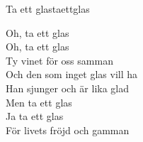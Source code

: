 \begin{song}{Ta ett glas}{taettglas}
\begin{vers}
Oh, ta ett glas\\
Oh, ta ett glas\\
Ty vinet för oss samman\\
Och den som inget glas vill ha\\
Han sjunger och är lika glad\\
Men ta ett glas\\
Ja ta ett glas\\
För livets fröjd och gamman\\
\end{vers}
\end{song}
